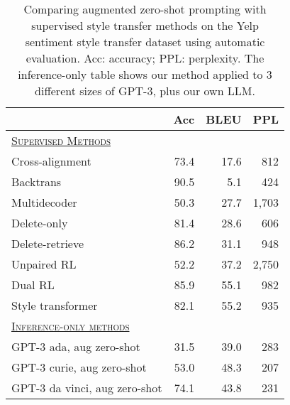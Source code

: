 
\begin{table}[t]
\caption{
Comparing augmented zero-shot prompting with supervised style transfer methods on the Yelp sentiment style transfer dataset using automatic evaluation.
Acc: accuracy; PPL: perplexity.  The inference-only table shows our method applied to 3 different sizes of GPT-3, plus our own LLM. 
}
        \label{tab:summary_table}
    \setlength{\tabcolsep}{3pt}
    \centering \small 
        \begin{tabular}{l r r r}
        \toprule
         & Acc & BLEU & PPL\\
        \midrule
        \underline{\textsc{Supervised Methods}} \\
        Cross-alignment \citep{NIPS2017_2d2c8394} & 73.4 & 17.6 & 812 \\
        Backtrans \citep{prabhumoye-etal-2018-style} & 90.5 & 5.1 & 424 \\
        Multidecoder \citep{AAAI1817015}  & 50.3 & 27.7 & 1,703\\
        Delete-only \citep{li-etal-2018-delete} & 81.4 & 28.6 & 606 \\
        Delete-retrieve \citep{li-etal-2018-delete} & 86.2 & 31.1 & 948\\
        Unpaired RL \citep{xu-etal-2018-unpaired} & 52.2 & 37.2 & 2,750\\
        Dual RL \citep{DBLP:conf/ijcai/LuoLZYCSS19} & 85.9 & 55.1 & 982\\
        Style transformer \citep{dai-etal-2019-style} & 82.1 & 55.2 & 935\\
        \midrule
        \underline{\textsc{Inference-only methods}} \\
        GPT-3 ada, aug zero-shot& 31.5 & 39.0 & 283\\
        GPT-3 curie, aug zero-shot& 53.0 & 48.3 & 207\\
        GPT-3 da vinci, aug zero-shot& 74.1 & 43.8 & 231\\

\end{tabular}
\end{table}
